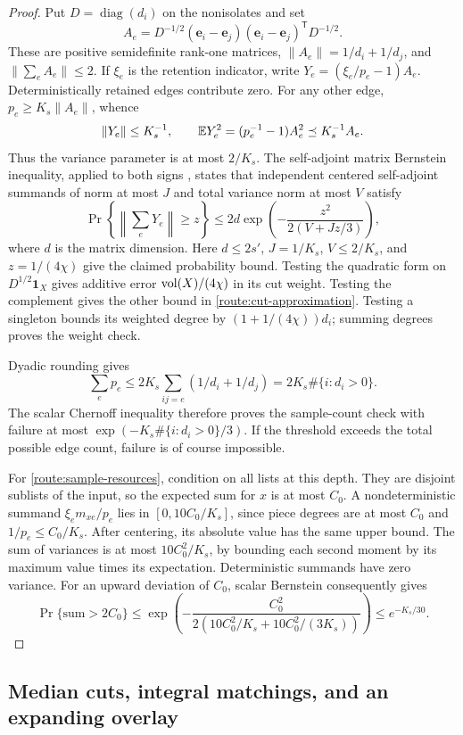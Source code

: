 \begin{proof}
Put $D=\operatorname{diag}(d_i)$ on the nonisolates and set
\[
 A_e=D^{-1/2}(\mathbf e_i-\mathbf e_j)
             (\mathbf e_i-\mathbf e_j)^\mathsf{T}D^{-1/2}.
\]
These are positive semidefinite rank-one matrices,
$\|A_e\|=1/d_i+1/d_j$, and $\|\sum_e A_e\|\le2$.
If $\xi_e$ is the retention indicator, write
$Y_e=(\xi_e/p_e-1)A_e$.  Deterministically retained edges contribute
zero.  For any other edge, $p_e\ge K_s\|A_e\|$, whence
\[
 \|Y_e\|\le K_s^{-1},\qquad
 \mathbb E Y_e^2=(p_e^{-1}-1)A_e^2\preceq K_s^{-1}A_e.
\]
Thus the variance parameter is at most $2/K_s$.  The self-adjoint
matrix Bernstein inequality, applied to both signs
\cite[Theorem~6.1(ii)]{TroppBernstein}, states that independent centered
self-adjoint summands of norm at most $J$ and total variance norm at
most $V$ satisfy
\[
 \Pr\left\{\left\|\sum_eY_e\right\|\ge z\right\}
 \le2d\exp\left(-\frac{z^2}{2(V+Jz/3)}\right),
\]
where $d$ is the matrix dimension.  Here $d\le2s'$, $J=1/K_s$,
$V\le2/K_s$, and $z=1/(4\chi)$ give the claimed probability bound.
Testing the quadratic form on $D^{1/2}\mathbf1_X$ gives additive
error $\operatorname{vol}(X)/(4\chi)$ in its cut weight.  Testing the complement
gives the other bound in \eqref{route:cut-approximation}.  Testing a
singleton bounds its weighted degree by
$(1+1/(4\chi))d_i$; summing degrees proves the weight check.

Dyadic rounding gives
\[
 \sum_ep_e\le2K_s\sum_{ij=e}(1/d_i+1/d_j)
       =2K_s\#\{i:d_i>0\}.
\]
The scalar Chernoff inequality therefore proves the sample-count
check with failure at most $\exp(-K_s\#\{i:d_i>0\}/3)$.
If the threshold exceeds the total possible edge count, failure is
of course impossible.

For \eqref{route:sample-resources}, condition on all lists at this
depth.  They are disjoint sublists of the input, so the expected sum
for $x$ is at most $C_0$.  A nondeterministic summand
$\xi_e m_{xe}/p_e$ lies in $[0,10C_0/K_s]$, since piece degrees are at
most $C_0$ and $1/p_e\le C_0/K_s$.  After centering, its absolute
value has the same upper bound.  The sum of variances is at most
$10C_0^2/K_s$, by bounding each second moment by its maximum value
times its expectation.  Deterministic summands have zero variance.
For an upward deviation of $C_0$, scalar Bernstein consequently
gives
\[
 \Pr\{\text{sum}>2C_0\}
 \le\exp\left(
 -\frac{C_0^2}{2(10C_0^2/K_s+10C_0^2/(3K_s))}\right)
 \le e^{-K_s/30}.
\]
\end{proof}

\subsection{Median cuts, integral matchings, and an expanding overlay}

